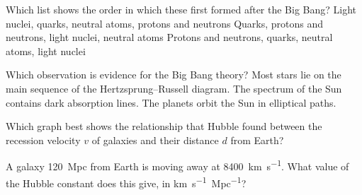 
\begin{quizq}{}
Which list shows the order in which these first formed after the Big Bang?
  {Light nuclei, quarks, neutral atoms, protons and neutrons}
  {Quarks, protons and neutrons, light nuclei, neutral atoms}
  {Protons and neutrons, quarks, neutral atoms, light nuclei}
\end{quizq}

\begin{quizq}{}
Which observation is evidence for the Big Bang theory?
  {Most stars lie on the main sequence of the Hertzsprung--Russell diagram.}
  {The spectrum of the Sun contains dark absorption lines.}
  {The planets orbit the Sun in elliptical paths.}
\end{quizq}

\begin{quizq}{}
Which graph best shows the relationship that Hubble found between the recession velocity $v$ of
galaxies and their distance $d$ from Earth?
  {%
  }
  {%
  }
  {%
  }
\end{quizq}

\begin{quizq}{}
A galaxy \qty{120}{Mpc} from Earth is moving away at \qty{8400}{km.s^{-1}}. What value of the Hubble
constant does this give, in \si{km.s^{-1}.Mpc^{-1}}?
\end{quizq}

